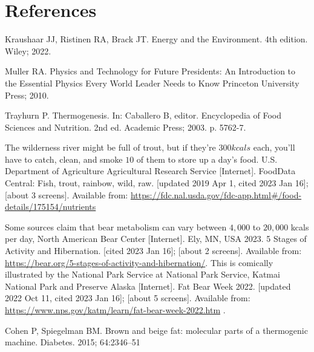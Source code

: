 \documentclass[12pt]{iopart}
\begin{document}
\section*{References}
\begin{thebibliography}{99}

Kraushaar JJ, Ristinen RA, Brack JT.
Energy and the Environment. 4th edition.
Wiley; 2022.

Muller RA.
Physics and Technology for Future Presidents: An Introduction to the Essential Physics Every World Leader Needs to Know
Princeton University Press; 2010.

Trayhurn P.
Thermogenesis.
In: Caballero B, editor.
Encyclopedia of Food Sciences and Nutrition. 2nd ed.
Academic Press;
2003.
p. 5762-7.

The wilderness river might be full of trout, but if they're $300kcals$ each, you'll have to catch, clean, and smoke $10$ of them to store up a day's food.
U.S. Department of Agriculture Agricultural Research Service [Internet].
FoodData Central: Fish, trout, rainbow, wild, raw.
[updated 2019 Apr 1, cited 2023 Jan 16]; [about 3 screens].
Available from: \url{https://fdc.nal.usda.gov/fdc-app.html#/food-details/175154/nutrients}

Some sources claim that bear metabolism can vary between $4,000$ to $20,000$ kcals per day, 
North American Bear Center [Internet]. 
Ely, MN, USA 2023. 
5 Stages of Activity and Hibernation.
[cited 2023 Jan 16]; [about 2 screens].
Available from: \url{https://bear.org/5-stages-of-activity-and-hibernation/}.
This is comically illustrated by the National Park Service at 
National Park Service, Katmai National Park and Preserve Alaska [Internet].
Fat Bear Week 2022.
[updated 2022 Oct 11, cited 2023 Jan 16]; [about 5 screens].
Available from: \url{https://www.nps.gov/katm/learn/fat-bear-week-2022.htm} .


Cohen P, Spiegelman BM.
Brown and beige fat: molecular parts of a thermogenic machine.
Diabetes.
2015;
64:2346–51


\end{thebibliography}
\end{document}
